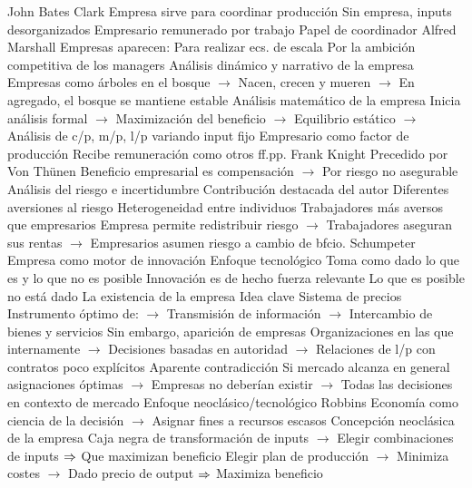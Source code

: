 \documentclass{nuevotema}
\begin{document}
\begin{esquemal}
			\3 John Bates Clark
				\4 Empresa sirve para coordinar producción
				\4 Sin empresa, inputs desorganizados
				\4 Empresario remunerado por trabajo
				\4[] Papel de coordinador
			\3 Alfred Marshall
				\4 Empresas aparecen:
				\4[] Para realizar ecs. de escala
				\4[] Por la ambición competitiva de los managers
				\4 Análisis dinámico y narrativo de la empresa
				\4[] Empresas como árboles en el bosque
				\4[] $\to$ Nacen, crecen y mueren
				\4[] $\to$ En agregado, el bosque se mantiene estable
				\4 Análisis matemático de la empresa
				\4[] Inicia análisis formal
				\4[] $\to$ Maximización del beneficio
				\4[] $\to$ Equilibrio estático
				\4[] $\to$ Análisis de c/p, m/p, l/p variando input fijo
				\4 Empresario como factor de producción
				\4[] Recibe remuneración como otros ff.pp.
			\3 Frank Knight
				\4 Precedido por Von Thünen
				\4[] Beneficio empresarial es compensación
				\4[] $\to$ Por riesgo no asegurable
				\4 Análisis del riesgo e incertidumbre
				\4[] Contribución destacada del autor
				\4 Diferentes aversiones al riesgo
				\4[] Heterogeneidad entre individuos
				\4 Trabajadores más aversos que empresarios
				\4[] Empresa permite redistribuir riesgo
				\4[] $\to$ Trabajadores aseguran sus rentas
				\4[] $\to$ Empresarios asumen riesgo a cambio de bfcio.
			\3 Schumpeter
				\4 Empresa como motor de innovación
				\4 Enfoque tecnológico
				\4[] Toma como dado lo que es y lo que no es posible
				\4 Innovación es de hecho fuerza relevante
				\4[] Lo que es posible no está dado
		\2 La existencia de la empresa
			\3 Idea clave
				\4 Sistema de precios
				\4[] Instrumento óptimo de:
				\4[] $\to$ Transmisión de información
				\4[] $\to$ Intercambio de bienes y servicios
				\4 Sin embargo, aparición de empresas
				\4[] Organizaciones en las que internamente
				\4[] $\to$ Decisiones basadas en autoridad
				\4[] $\to$ Relaciones de l/p con contratos poco explícitos
				\4 Aparente contradicción
				\4[] Si mercado alcanza en general asignaciones óptimas
				\4[] $\to$ Empresas no deberían existir
				\4[] $\to$ Todas las decisiones en contexto de mercado
			\3 Enfoque neoclásico/tecnológico
				\4 Robbins
				\4[] Economía como ciencia de la decisión
				\4[] $\to$ Asignar fines a recursos escasos
				\4 Concepción neoclásica de la empresa
				\4[] Caja negra de transformación de inputs
				\4[] $\to$ Elegir combinaciones de inputs
				\4[] $\Rightarrow$ Que maximizan beneficio
				\4[] Elegir plan de producción
				\4[] $\to$ Minimiza costes
				\4[] $\to$ Dado precio de output
				\4[] $\Rightarrow$ Maximiza beneficio

\end{esquemal}
\end{document}
